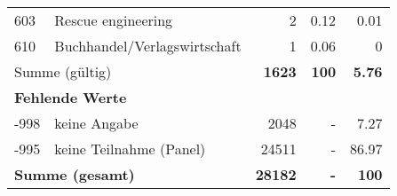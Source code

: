 \begin{longtable}{lXrrr}
        603 & \multicolumn{1}{X}{Rescue engineering} & %
          \num{2} &
          \num[round-mode=places,round-precision=2]{0.12} &
          \num[round-mode=places,round-precision=2]{0.01} \\

        610 & \multicolumn{1}{X}{Buchhandel/Verlagswirtschaft} & %
          \num{1} &
          \num[round-mode=places,round-precision=2]{0.06} &
          \num[round-mode=places,round-precision=2]{0} \\

     \midrule
     \multicolumn{2}{l}{Summe (gültig)} &
       \textbf{\num{1623}} &
     \textbf{100} &
       \textbf{\num[round-mode=places,round-precision=2]{5.76}} \\
     \multicolumn{5}{l}{\textbf{Fehlende Werte}}\\
       -998 &
       keine Angabe &
         \num{2048} &
        - &
         \num[round-mode=places,round-precision=2]{7.27} \\
       -995 &
       keine Teilnahme (Panel) &
         \num{24511} &
        - &
         \num[round-mode=places,round-precision=2]{86.97} \\
     \midrule
     \multicolumn{2}{l}{\textbf{Summe (gesamt)}} &
          \textbf{\num{28182}} &
        \textbf{-} &
        \textbf{100} \\
     \bottomrule
     \end{longtable}
     
